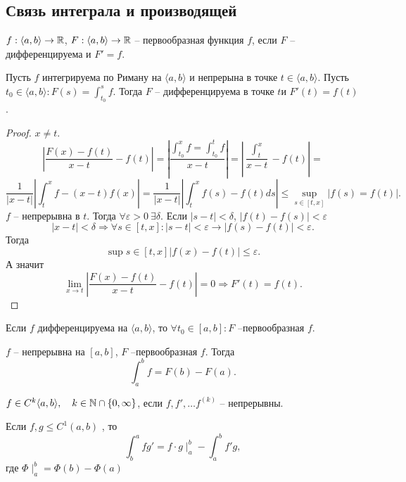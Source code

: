 \documentclass[12pt]{report}
\begin{document}
\subsection{Связь интеграла и производящей}
$ f : \langle a, b \rangle  \to  \mathbb{R}$, $ F: \langle a, b \rangle \to  \mathbb{R}$ -- первообразная функция $ f$, если $ F$ -- дифференцируема и $ F' = f$.
 \begin{thm}
     Пусть $ f$ интегрируема по Риману на $ \langle a, b \rangle$ и непрерына в точке $ t \in  \langle a, b \rangle$. Пусть $ t_0 \in  \langle a, b \rangle: F(s) = \int_{t_0} ^{s} f$.
     Тогда $ F$ -- дифференцируема в точке $ t$и $ F'(t) = f(t)$.
\end{thm}
\begin{proof}
    $ x \ne t$.\[
	\left |	\frac{F(x) - f(t)}{x-t} - f(t) \right | = \left| \frac{\int_{t_0}^{x} f = \int_{t_0} ^{t} f}{x - t} \right| = \left| \frac{\int_t^{x}}{x - t} - f(t) \right|  = 
    \] 
    \[
	\frac{1}{|x-t|} \left| \int _t ^{ x} f - (x-t)f(x) \right|  = \frac{1}{|x-t|}\left |{\int_t ^{x} f(s) - f(t) ds } \right | \le  \sup_{s \in  [t, x] } |f(s) = f(t)|
    .\] 
    $ f$ -- непрерывна в $ t$. Тогда $ \forall  \varepsilon  > 0 ~ \exists  \delta  $. Если $| s- t| < \delta$, $ |f(t) - f(s) |< \varepsilon $
    \[
	|x - t| < \delta  \Longrightarrow \forall s \in  [t, x]: |s - t| < \varepsilon  \to |f(s) - f(t) | < \varepsilon 
    .\] 
    Тогда \[
	\sup{s \in [t, x]} |f(x) - f(t)| \le  \varepsilon 
    .\] 
    А значит \[
	\lim_{x \to  t} |\frac{F(x) - f(t)}{x -t}- f(t)| = 0 \Longrightarrow F'(t) = f(t)
    .\] 
\end{proof}
\begin{cor}
    Если $ f$ дифференцируема на $ \langle a, b \rangle$, то $ \forall t_0 \in  [a, b]: F $ --первообразная $ f$.
\end{cor}
\begin{cor}
    $ f$ -- непрерывна на $ [a, b]$, $ F$ --первообразная $ f$. Тогда \[
	\int_a^{b} f = F(b) - F(a)
    .\] 
\end{cor}
\begin{defn}
    $ f \in  C^{k} \langle a, b \rangle, \quad k \in \mathbb{N} \cap  \{0,  \infty\}$, если $ f, f', \ldots f^{(k)} $ -- непрерывны.
\end{defn}
\begin{thm}
    Если $ f, g \le  C^{1} (a, b)$ , то
    \[
    \int _b ^{a} f g' = f \cdot g \mid _a ^{ b} - \int_a ^{ b} f' g
    ,\] 
    где $ \Phi \mid _a ^{ b} = \Phi(b) - \Phi(a)$
\end{thm}
\end{document}
